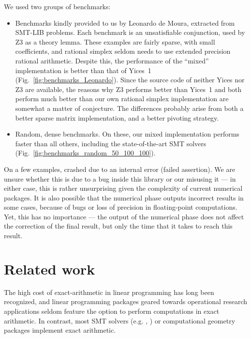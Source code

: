 We used two groups of benchmarks:
\begin{itemize}
\item Benchmarks kindly provided to us by Leonardo de Moura, extracted from SMT-LIB problems. Each benchmark is an unsatisfiable conjunction, used by Z3 as a theory lemma. These examples are fairly sparse, with small coefficients, and rational simplex seldom needs to use extended precision rational arithmetic. Despite this, the performance of the ``mixed'' implementation is better than that of Yices~1 (Fig.~\ref{fig:benchmarks_Leonardo}). Since the source code of neither Yices nor Z3 are available, the reasons why Z3 performs better than Yices~1 and both perform much better than our own rational simplex implementation are somewhat a matter of conjecture. The differences probably arise from both a better sparse matrix implementation, and a better pivoting strategy.

\item Random, dense benchmarks. On these, our mixed implementation performs faster than all others, including the state-of-the-art SMT solvers (Fig.~\ref{fig:benchmarks_random_50_100_100}).
\end{itemize}

On a few examples,  crashed due to an internal error (failed assertion). We are unsure whether this is due to a bug inside this library or our misusing it --- in either case, this is rather unsurprising given the complexity of current numerical packages. It is also possible that the numerical phase outputs incorrect results in some cases, because of bugs or loss of precision in floating-point computations. Yet, this has no importance --- the output of the numerical phase does not affect the correction of the final result, but only the time that it takes to reach this result.

\section{Related work}
The high cost of exact-arithmetic in linear programming has long been recognized, and linear programming packages geared towards operational research applications seldom feature the option to perform computations in exact arithmetic. In contrast, most SMT solvers (e.g. , ) or computational geometry packages implement exact arithmetic.

